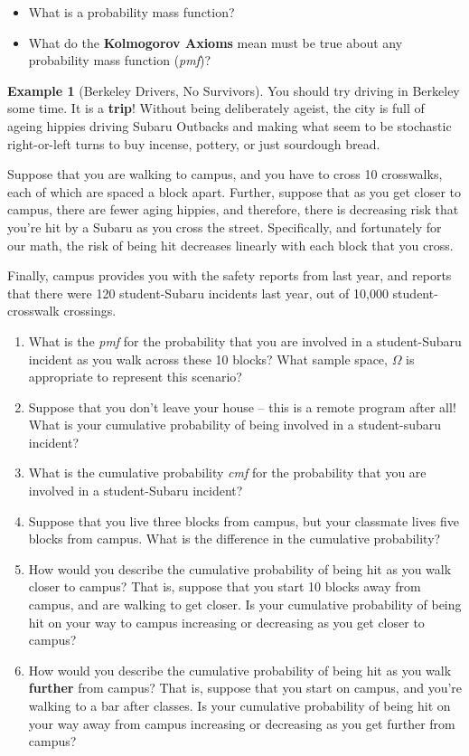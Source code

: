 \documentclass[
]{book}
\providecommand{\tightlist}{%
  \setlength{\itemsep}{0pt}\setlength{\parskip}{0pt}}
\theoremstyle{definition}
\theoremstyle{definition}
\newtheorem{example}{Example}[chapter]
\theoremstyle{definition}
\theoremstyle{definition}
\theoremstyle{remark}
\begin{document}
\begin{itemize}
\tightlist
\item
  What is a probability mass function?
\item
  What do the \textbf{Kolmogorov Axioms} mean must be true about any probability mass function (\emph{pmf})?
\end{itemize}

\begin{example}[Berkeley Drivers, No Survivors]

You should try driving in Berkeley some time. It is a \textbf{trip}! Without being deliberately ageist, the city is full of ageing hippies driving Subaru Outbacks and making what seem to be stochastic right-or-left turns to buy incense, pottery, or just sourdough bread.

Suppose that you are walking to campus, and you have to cross 10 crosswalks, each of which are spaced a block apart. Further, suppose that as you get closer to campus, there are fewer aging hippies, and therefore, there is decreasing risk that you're hit by a Subaru as you cross the street. Specifically, and fortunately for our math, the risk of being hit decreases linearly with each block that you cross.

Finally, campus provides you with the safety reports from last year, and reports that there were 120 student-Subaru incidents last year, out of 10,000 student-crosswalk crossings.

\begin{enumerate}
\def\labelenumi{\arabic{enumi}.}
\tightlist
\item
  What is the \emph{pmf} for the probability that you are involved in a student-Subaru incident as you walk across these 10 blocks? What sample space, \(\Omega\) is appropriate to represent this scenario?
\item
  Suppose that you don't leave your house -- this is a remote program after all! What is your cumulative probability of being involved in a student-subaru incident?\\
\item
  What is the cumulative probability \emph{cmf} for the probability that you are involved in a student-Subaru incident?
\item
  Suppose that you live three blocks from campus, but your classmate lives five blocks from campus. What is the difference in the cumulative probability?
\item
  How would you describe the cumulative probability of being hit as you walk closer to campus? That is, suppose that you start 10 blocks away from campus, and are walking to get closer. Is your cumulative probability of being hit on your way to campus increasing or decreasing as you get closer to campus?
\item
  How would you describe the cumulative probability of being hit as you walk \textbf{further} from campus? That is, suppose that you start on campus, and you're walking to a bar after classes. Is your cumulative probability of being hit on your way away from campus increasing or decreasing as you get further from campus?
\end{enumerate}

\end{example}
\end{document}
